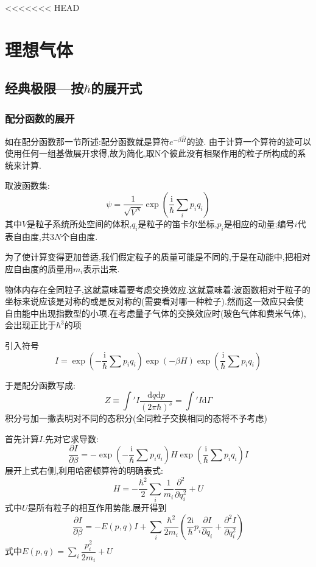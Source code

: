 <<<<<<< HEAD

\section[支线1---理想气体]{理想气体}
\subsection{经典极限---按$\hbar$的展开式}

\subsubsection{配分函数的展开}
如在配分函数那一节所述:配分函数就是算符$e^{-\beta \hat{H}}$的迹. 由于计算一个算符的迹可以使用任何一组基做展开求得,故为简化,取N个彼此没有相聚作用的粒子所构成的系统来计算.

取波函数集:
\[\psi=\frac{1}{\sqrt{V^{N}}}\exp(\frac{\mathrm{i}}{\hbar}\sum_i p_iq_i)\]
其中$V$是粒子系统所处空间的体积,$q_i$是粒子的笛卡尔坐标,$p_i$是相应的动量;编号$i$代表自由度,共$3N$个自由度.

为了使计算变得更加普适,我们假定粒子的质量可能是不同的,于是在动能中,把相对应自由度的质量用$m_i$表示出来.

物体内存在全同粒子,这就意味着要考虑交换效应.这就意味着:波函数相对于粒子的坐标来说应该是对称的或是反对称的(需要看对哪一种粒子).然而这一效应只会使自由能中出现指数型的小项.在考虑量子气体的交换效应时(玻色气体和费米气体),会出现正比于$\hbar^3$的项

\vspace*{0.5cm}

引入符号
\[I=\exp(-\dfrac{\mathrm{i} }{\hbar}\sum p_i q_i)\exp(-\beta H) \exp(\dfrac{\mathrm{i} }{\hbar}\sum p_i q_i)\]

于是配分函数写成:
\begin{equation}
  Z\equiv \int' I \dfrac{\mathrm{d} q\mathrm{d} p}{(2\pi \hbar)^{s}}=\int'I \mathrm{d} \Gamma
\end{equation}
积分号加一撇表明对不同的态积分(全同粒子交换相同的态将不予考虑)

\vspace*{0.5cm}

首先计算$I$.先对它求导数:
\[\dfrac{\partial I}{\partial \beta}=-\exp(-\dfrac{\mathrm{i} }{\hbar}\sum p_i q_i)H\exp(\dfrac{\mathrm{i} }{\hbar}\sum p_i q_i)I\]
展开上式右侧,利用哈密顿算符的明确表式:
\[H=-\dfrac{\hbar^2}{2}\sum_i \frac{1}{m_i}\frac{\partial^2 }{\partial q_i^2}+U\]
式中$U$是所有粒子的相互作用势能.展开得到
\begin{equation}
  \dfrac{\partial I}{\partial \beta}=-E(p,q)I+\sum_i \dfrac{\hbar^{2}}{2m_i}\left( \dfrac{2\mathrm{i} }{\hbar}p_i \dfrac{\partial I}{\partial q_i}+\frac{\partial^2 I}{\partial q_i^2} \right) 
\end{equation}
式中$E(p,q)=\sum_i \dfrac{p_i^{2}}{2m_i}+U$

